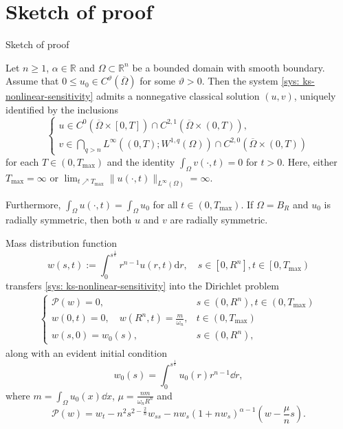 \section{Sketch of proof}
\begin{frame}{Sketch of proof}

\begin{lemma}\label{local existence and uniqueness}
	Let $n\geqslant1$, $\alpha\in\mathbb{R}$ and $\Omega\subset\mathbb{R}^n$ be a bounded domain with smooth boundary. Assume that $0\leq u_0\in C^\vartheta(\overline{\Omega})$ for some $\vartheta>0$. Then the system \eqref{sys: ks-nonlinear-sensitivity} admits a nonnegative classical solution $(u, v)$, uniquely identified by the inclusions 
\begin{equation}\nonumber
	\begin{cases}
		u \in C^{0}(\overline{\Omega} \times[0, T]) \cap C^{2,1}(\overline{\Omega} \times(0, T)), \\
		v \in \bigcap_{q>n} L^{\infty}\left((0, T) ; W^{1, q}(\Omega)\right) \cap C^{2,0}(\overline{\Omega} \times(0, T))
	\end{cases}
\end{equation}
for each $T\in(0, T_{\max})$ and the identity $\int_{\Omega} v(\cdot, t)=0$ for  $t > 0$. Here, either $T_{\max} = \infty$ or $\lim_{t\nearrow T_{\max}}
		\|u(\cdot, t)\|_{L^\infty(\Omega)} = \infty$.

Furthermore, $\int_{\Omega} u(\cdot, t) = \int_{\Omega} u_{0}$ for all $t \in\left(0, T_{\max }\right)$. 
If $\Omega = B_R$ and $u_0$ is radially symmetric, then both $u$ and $v$ are radially symmetric.
\end{lemma}
\end{frame}

\begin{frame}{Mass distribution function}
\begin{equation}\label{partial mass substitution}
	w(s, t):=\int_{0}^{s^{\frac{1}{n}}} r^{n-1} u(r, t) \mathrm{d} r, \quad s \in\left[0, R^{n}\right], t \in\left[0, T_{\max }\right)
\end{equation}
transfers \eqref{sys: ks-nonlinear-sensitivity}  into the Dirichlet problem
\begin{align}\label{partial mass pde}
    \begin{cases}
		\mathcal{P}(w) = 0, & s \in(0, R^{n}), t \in\left(0, T_{\max }\right)\\
		w(0, t)=0, \quad w\left(R^{n}, t\right)=\frac{m}{\omega_{n}}, & t \in\left(0, T_{\max }\right)\\
		w(s, 0) = w_0(s), & s\in(0, R^n), 
    \end{cases}
\end{align}
along with an evident initial condition
\begin{equation}\label{partial mass initial data}
	w_0(s) = \int_0^{s^\frac{1}{n}}u_0(r)r^{n-1}\dd r,
\end{equation}
where $m = \int_\Omega u_0(x)\dd x$, $\mu = \frac{nm}{\omega_nR^n}$ and
\[
\mathcal{P}(w) = w_{t} - n^{2} s^{2-\frac{2}{n}} w_{s s} - nw_{s}(1 + nw_s)^{\alpha -1} (w-\frac\mu n s).  
\]
\end{frame}

